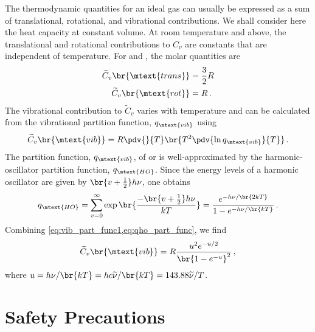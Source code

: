 The thermodynamic quantities for an ideal gas can usually be expressed as a sum of translational, rotational, and vibrational contributions. 
We shall consider here the heat capacity at constant volume. 
At room temperature and above, the translational and rotational contributions to \( C_v \) are constants that are independent of temperature. 
For  and , the molar quantities are 
\begin{align}
	\begin{split}
		\widetilde{C}_v\br{\mtext{trans}}	&=	\frac{3}{2}R \\
		\widetilde{C}_v\br{\mtext{rot}}		&=	R \, .
	\end{split}
	\label{eq:c_v_rot_vib}
\end{align}
The vibrational contribution to \( \widetilde{C}_v \) varies with temperature and can be calculated from the vibrational partition function, \( q_\mtext{vib} \) using 
\begin{equation}
	\widetilde{C}_v\br{\mtext{vib}} = R \pdv{}{T} \br{T^2 \pdv{\ln{q_\mtext{vib}}}{T}} \, .
	\label{eq:vib_part_func1}
\end{equation}
The partition function, \( q_\mtext{vib} \), of  or  is well-approximated by the harmonic-oscillator partition function, \( q_\mtext{HO} \). 
Since the energy levels of a harmonic oscillator are given by \( \br{v + \tfrac{1}{2}} h \nu \), one obtains~\autocite{levine95}
\begin{equation}
	q_\mtext{HO} = \sum_{v = 0}^\infty \exp \br{\frac{-\br{v + \tfrac{1}{2}} h \nu}{k T}} = \frac{e^{-h \nu/\br{2kT}}}{{1 - e^{-h \nu / \br{k T}}}} \, .
	\label{eq:qho_part_func}
\end{equation}
Combining \cref{eq:vib_part_func1,eq:qho_part_func}, we find 
\begin{equation}
	\widetilde{C}_v\br{\mtext{vib}} = R \frac{u^2 e^{-u/2}}{\br{1 - e^{-u}}^2} \, ,
	\label{eq:vib_part_func2}
\end{equation}
where \( u = h \nu / \br{kT} = h c \widetilde{\nu} / \br{k T} = 143.88 \widetilde{\nu} / T \). 




\pagebreak

\section{Safety Precautions} %
\label{sec:safety}

